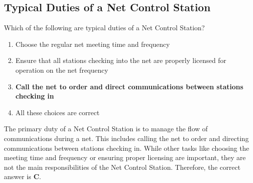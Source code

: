 \subsection{Typical Duties of a Net Control Station}
\label{T2C02}

\begin{tcolorbox}[colback=gray!10!white,colframe=black!75!black,title=T2C02]
Which of the following are typical duties of a Net Control Station?
\begin{enumerate}[noitemsep]
    \item Choose the regular net meeting time and frequency
    \item Ensure that all stations checking into the net are properly licensed for operation on the net frequency
    \item \textbf{Call the net to order and direct communications between stations checking in}
    \item All these choices are correct
\end{enumerate}
\end{tcolorbox}

The primary duty of a Net Control Station is to manage the flow of communications during a net. This includes calling the net to order and directing communications between stations checking in. While other tasks like choosing the meeting time and frequency or ensuring proper licensing are important, they are not the main responsibilities of the Net Control Station. Therefore, the correct answer is \textbf{C}.